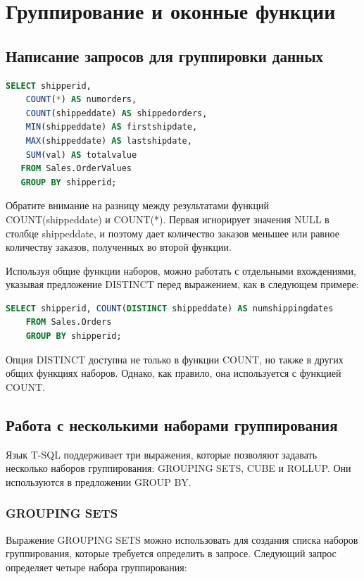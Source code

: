 \chapter{Группирование и оконные функции}
\section{Написание запросов для группировки данных}


\begin{lstlisting}[label=lst:funcReturn, language=sql]
	SELECT shipperid,
	COUNT(*) AS numorders,
	COUNT(shippeddate) AS shippedorders,
	MIN(shippeddate) AS firstshipdate,
	MAX(shippeddate) AS lastshipdate,
	SUM(val) AS totalvalue
   FROM Sales.OrderValues
   GROUP BY shipperid; 
\end{lstlisting}

Обратите внимание на разницу между результатами функций COUNT(shippeddate) и
COUNT(*). Первая игнорирует значения NULL в столбце shippeddate, и поэтому дает
количество заказов меньшее или равное количеству заказов, полученных во второй
функции.

Используя общие функции наборов, можно работать с отдельными вхождениями,
указывая предложение DISTINCT перед выражением, как в следующем примере: 


\begin{lstlisting}[label=lst:funcReturn, language=sql]
	SELECT shipperid, COUNT(DISTINCT shippeddate) AS numshippingdates
	FROM Sales.Orders
	GROUP BY shipperid;
\end{lstlisting}

Опция DISTINCT доступна не только в функции COUNT, но также в других общих
функциях наборов. Однако, как правило, она используется с функцией COUNT.

\section{Работа с несколькими наборами группирования}


Язык T-SQL поддерживает три выражения, которые позволяют задавать несколько наборов группирования: GROUPING SETS, CUBE и
ROLLUP. Они используются в предложении GROUP BY.

\subsection{GROUPING SETS}

Выражение GROUPING SETS можно использовать для создания списка наборов группирования, которые требуется определить в запросе. Следующий запрос определяет четыре набора группирования:

